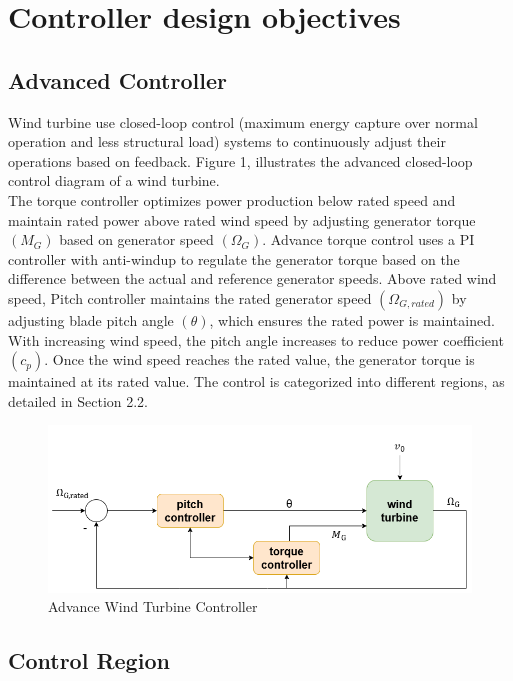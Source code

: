 \chapter{Controller design objectives}
\section{Advanced Controller}

Wind turbine use closed-loop control (maximum energy capture over normal operation and less structural load) systems to continuously adjust their operations based on feedback. Figure 1, illustrates the advanced closed-loop control diagram of a wind turbine. 
\\[16pt]
The torque controller optimizes power production below rated speed and maintain rated power above rated wind speed by adjusting generator torque $(M_G)$ based on generator speed $(\Omega_G)$. Advance torque control uses a PI controller with anti-windup to regulate the generator torque based on the difference between the actual and reference generator speeds. Above rated wind speed, Pitch controller maintains the rated generator speed $(\Omega_{G,rated})$ by adjusting blade pitch angle $(\theta)$, which ensures the rated power is maintained. With increasing wind speed, the pitch angle increases to reduce power coefficient $(c_p)$. Once the wind speed reaches the rated value, the generator torque is maintained at its rated value. The control is categorized into different regions, as detailed in Section 2.2.

\begin{figure}[htbp]
	\centering
	\includegraphics[width=\textwidth]{Figure/Figure_1.png}
	\caption{Advance Wind Turbine Controller}
\end{figure}
 

\section{Control Region}

